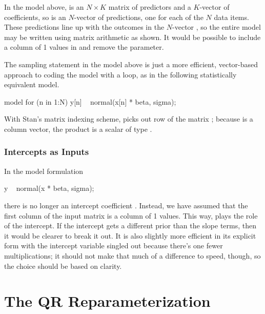 In the model above,  is an $N \times K$ matrix of predictors
and  a $K$-vector of coefficients, so  is an
$N$-vector of predictions, one for each of the $N$ data items.  These
predictions line up with the outcomes in the $N$-vector , so
the entire model may be written using matrix arithmetic as shown.  It
would be possible to include a column of 1 values in  and
remove the  parameter.  

The sampling statement in the model above is just a more efficient,
vector-based approach to coding the model with a loop, as in the
following statistically equivalent model.
%
\begin{stancode}
model {
  for (n in 1:N)
    y[n] ~ normal(x[n] * beta, sigma);
}
\end{stancode}
%
With Stan's matrix indexing scheme,  picks out row 
of the matrix ;  because  is a column vector, 
the product  is a scalar of type .

\subsubsection{Intercepts as Inputs}

In the model formulation
%
\begin{stancode}
  y ~ normal(x * beta, sigma);
\end{stancode}
%
there is no longer an intercept coefficient .  Instead, we
have assumed that the first column of the input matrix  is a
column of 1 values.  This way,  plays the role of the
intercept.  If the intercept gets a different prior than the slope
terms, then it would be clearer to break it out.  It is also slightly
more efficient in its explicit form with the intercept variable
singled out because there's one fewer multiplications; it should not
make that much of a difference to speed, though, so the choice should
be based on clarity.

\section{The QR Reparameterization}\label{QR-reparameterization.section}

